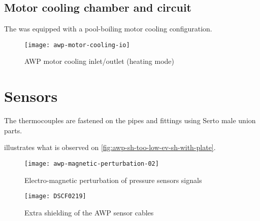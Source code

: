 \subsection{Motor cooling chamber and circuit}
\label{sec:awp-motor-cooling-details}

The \AWP{} was equipped with a pool-boiling motor cooling configuration.

\begin{figure}[htbp]
  \centering
  \texttt{[image: awp-motor-cooling-io]}
  \caption{AWP motor cooling inlet/outlet (heating mode)}
  \label{fig:awp_motor_cooling_io}
\end{figure}

\section{Sensors}
\label{sec:awp-sensors}

The thermocouples are fastened on the pipes and fittings using Serto
male union parts.

 illustrates what is
observed on \cref{fig:awp-sh-too-low-ev-sh-with-plate}.

\begin{figure}[htbp]
  \centering
  \texttt{[image: awp-magnetic-perturbation-02]}
  \caption{Electro-magnetic perturbation of pressure sensors signals}
  \label{fig:awp-electromagnetic-perturbation-P}
\end{figure}

\begin{figure}
  \centering
  \texttt{[image: DSCF0219]}
  \caption{Extra shielding of the AWP sensor cables}
  \label{fig:awp-alu-sheets-shield}
\end{figure}


\FloatBarrier



\label{sec:awp-components-refs}
